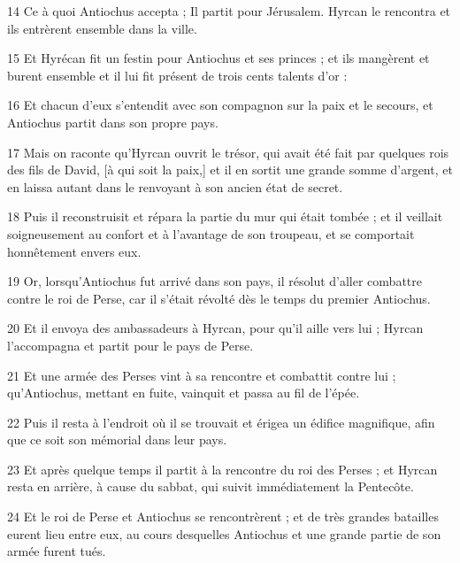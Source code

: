 \par 14 Ce à quoi Antiochus accepta ; Il partit pour Jérusalem. Hyrcan le rencontra et ils entrèrent ensemble dans la ville.

\par 15 Et Hyrécan fit un festin pour Antiochus et ses princes ; et ils mangèrent et burent ensemble et il lui fit présent de trois cents talents d'or :

\par 16 Et chacun d'eux s'entendit avec son compagnon sur la paix et le secours, et Antiochus partit dans son propre pays.

\par 17 Mais on raconte qu'Hyrcan ouvrit le trésor, qui avait été fait par quelques rois des fils de David, [à qui soit la paix,] et il en sortit une grande somme d'argent, et en laissa autant dans le renvoyant à son ancien état de secret.

\par 18 Puis il reconstruisit et répara la partie du mur qui était tombée ; et il veillait soigneusement au confort et à l'avantage de son troupeau, et se comportait honnêtement envers eux.

\par 19 Or, lorsqu'Antiochus fut arrivé dans son pays, il résolut d'aller combattre contre le roi de Perse, car il s'était révolté dès le temps du premier Antiochus.

\par 20 Et il envoya des ambassadeurs à Hyrcan, pour qu'il aille vers lui ; Hyrcan l'accompagna et partit pour le pays de Perse.

\par 21 Et une armée des Perses vint à sa rencontre et combattit contre lui ; qu'Antiochus, mettant en fuite, vainquit et passa au fil de l'épée.

\par 22 Puis il resta à l'endroit où il se trouvait et érigea un édifice magnifique, afin que ce soit son mémorial dans leur pays.

\par 23 Et après quelque temps il partit à la rencontre du roi des Perses ; et Hyrcan resta en arrière, à cause du sabbat, qui suivit immédiatement la Pentecôte.

\par 24 Et le roi de Perse et Antiochus se rencontrèrent ; et de très grandes batailles eurent lieu entre eux, au cours desquelles Antiochus et une grande partie de son armée furent tués.

